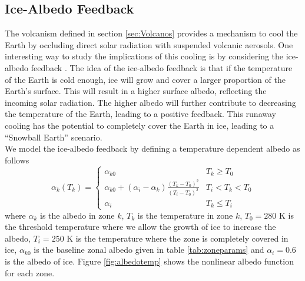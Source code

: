 \documentclass[12pt]{article}
\begin{document}
\subsection{Ice-Albedo Feedback} \label{sec:Ice}
The volcanism defined in section \ref{sec:Volcanos} provides a mechanism to
cool the Earth by occluding direct solar radiation with suspended volcanic
aerosols. One interesting way to study the implications of this cooling is by
considering the ice-albedo feedback \cite{budyko_albedo}. The idea of the
ice-albedo feedback is that if the temperature of the Earth is cold enough,
ice will grow and cover a larger proportion of the Earth's surface. This
will result in a higher surface albedo, reflecting the incoming solar radiation.
The higher albedo will further contribute to decreasing the temperature of
the Earth, leading to a positive feedback. This runaway cooling has the potential
to completely cover the Earth in ice, leading to a ``Snowball Earth'' scenario. \\

We model the ice-albedo feedback by defining a temperature dependent albedo
as follows
\begin{equation} \label{eqn:albedoparam}
    \alpha_k(T_k) =
      \begin{cases}
      \alpha_{k0} & T_k \geq T_0 \\
      \alpha_{k0} + (\alpha_i-\alpha_k)\frac{(T_k-T_0)^2}{(T_i-T_0)^2}
      & T_i < T_k < T_0 \\
      \alpha_i & T_k \leq T_i
      \end{cases}
\end{equation}
where $\alpha_k$ is the albedo in zone $k$, $T_k$ is the temperature in
zone $k$, $T_0 = 280$ K is the threshold temperature where we allow the
growth of ice to increase the albedo, $T_i = 250$ K is the temperature
where the zone is completely covered in ice, $\alpha_{k0}$ is the baseline
zonal albedo given in table \ref{tab:zoneparams} and $\alpha_i = 0.6$ is the
albedo of ice. Figure \ref{fig:albedotemp} shows the nonlinear albedo function
for each zone.
\end{document}
